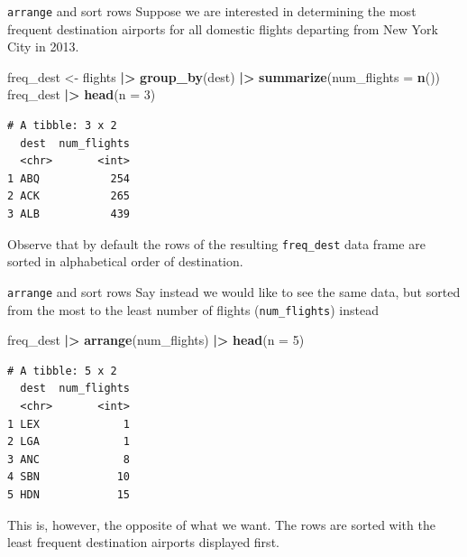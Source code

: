\documentclass[
  ignorenonframetext,
]{beamer}
\newenvironment{Shaded}{\begin{snugshade}}{\end{snugshade}}
\newcommand{\AttributeTok}[1]{\textcolor[rgb]{0.13,0.29,0.53}{#1}}
\newcommand{\DecValTok}[1]{\textcolor[rgb]{0.00,0.00,0.81}{#1}}
\newcommand{\FunctionTok}[1]{\textcolor[rgb]{0.13,0.29,0.53}{\textbf{#1}}}
\newcommand{\NormalTok}[1]{#1}
\newcommand{\OtherTok}[1]{\textcolor[rgb]{0.56,0.35,0.01}{#1}}
\newcommand{\SpecialCharTok}[1]{\textcolor[rgb]{0.81,0.36,0.00}{\textbf{#1}}}
\begin{document}
\begin{frame}[fragile]{\texttt{arrange} and sort rows}
\protect\hypertarget{arrange-and-sort-rows-1}{}
Suppose we are interested in determining the most frequent destination
airports for all domestic flights departing from New York City in 2013.

\normalsize

\begin{Shaded}
\begin{Highlighting}[]
\NormalTok{freq\_dest }\OtherTok{\textless{}{-}}\NormalTok{ flights }\SpecialCharTok{|\textgreater{}} 
  \FunctionTok{group\_by}\NormalTok{(dest) }\SpecialCharTok{|\textgreater{}} 
  \FunctionTok{summarize}\NormalTok{(}\AttributeTok{num\_flights =} \FunctionTok{n}\NormalTok{())}
\NormalTok{freq\_dest }\SpecialCharTok{|\textgreater{}} \FunctionTok{head}\NormalTok{(}\AttributeTok{n =} \DecValTok{3}\NormalTok{)}
\end{Highlighting}
\end{Shaded}

\begin{verbatim}
# A tibble: 3 x 2
  dest  num_flights
  <chr>       <int>
1 ABQ           254
2 ACK           265
3 ALB           439
\end{verbatim}

\normalsize

Observe that by default the rows of the resulting \texttt{freq\_dest}
data frame are sorted in alphabetical order of destination.
\end{frame}

\begin{frame}[fragile]{\texttt{arrange} and sort rows}
\protect\hypertarget{arrange-and-sort-rows-2}{}
Say instead we would like to see the same data, but sorted from the most
to the least number of flights (\texttt{num\_flights}) instead

\normalsize

\begin{Shaded}
\begin{Highlighting}[]
\NormalTok{freq\_dest }\SpecialCharTok{|\textgreater{}} 
  \FunctionTok{arrange}\NormalTok{(num\_flights) }\SpecialCharTok{|\textgreater{}} 
  \FunctionTok{head}\NormalTok{(}\AttributeTok{n =} \DecValTok{5}\NormalTok{)}
\end{Highlighting}
\end{Shaded}

\begin{verbatim}
# A tibble: 5 x 2
  dest  num_flights
  <chr>       <int>
1 LEX             1
2 LGA             1
3 ANC             8
4 SBN            10
5 HDN            15
\end{verbatim}

\normalsize

This is, however, the opposite of what we want. The rows are sorted with
the least frequent destination airports displayed first.
\end{frame}
\end{document}
